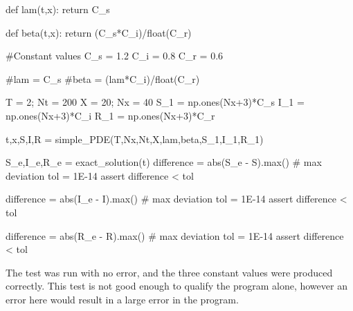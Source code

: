 \documentclass[%
twoside,                 %
final,                   %
10pt]{article}
\begin{document}
    def lam(t,x):
        return C_s

    def beta(t,x):
        return (C_s*C_i)/float(C_r)

    #Constant values
    C_s = 1.2
    C_i = 0.8
    C_r = 0.6
    
    #lam = C_s
    #beta = (lam*C_i)/float(C_r)
    
    T = 2; Nt = 200
    X = 20; Nx = 40
    S_1 = np.ones(Nx+3)*C_s
    I_1 = np.ones(Nx+3)*C_i
    R_1 = np.ones(Nx+3)*C_r
    
    t,x,S,I,R = simple_PDE(T,Nx,Nt,X,lam,beta,S_1,I_1,R_1)
    
    S_e,I_e,R_e = exact_solution(t)
    difference = abs(S_e - S).max()  # max deviation
    tol = 1E-14
    assert difference < tol

    difference = abs(I_e - I).max()  # max deviation
    tol = 1E-14
    assert difference < tol

    difference = abs(R_e - R).max()  # max deviation
    tol = 1E-14
    assert difference < tol
\epycod

The test was run with no error, and the three constant values were produced correctly. This test is not good enough to qualify the program alone, however an error here would result in a large error in the program. 
\end{document}
